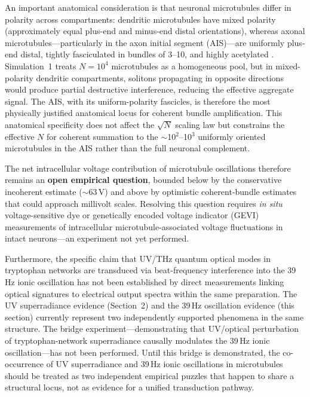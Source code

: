 \documentclass[10pt, a4paper, twocolumn]{article}
\begin{document}
An important anatomical consideration is that neuronal
microtubules differ in polarity across compartments: dendritic
microtubules have mixed polarity (approximately equal plus-end
and minus-end distal orientations), whereas axonal
microtubules---particularly in the axon initial segment
(AIS)---are uniformly plus-end distal, tightly fasciculated
in bundles of 3--10, and highly acetylated
\cite{beshkar2025}. Simulation~1 treats $N = 10^4$
microtubules as a homogeneous pool, but in mixed-polarity
dendritic compartments, solitons propagating in opposite
directions would produce partial destructive interference,
reducing the effective aggregate signal. The AIS, with its
uniform-polarity fascicles, is therefore the most physically
justified anatomical locus for coherent bundle amplification.
This anatomical specificity does not affect the $\sqrt{N}$
scaling law but constrains the effective $N$ for coherent
summation to the $\sim$10$^2$--10$^3$ uniformly oriented
microtubules in the AIS rather than the full neuronal
complement.

The net intracellular voltage contribution of microtubule
oscillations therefore remains an \textbf{open empirical
question}, bounded below by the conservative incoherent
estimate ($\sim\!63$\,\textmu V) and above by optimistic
coherent-bundle estimates that could approach millivolt
scales. Resolving this question requires \emph{in situ}
voltage-sensitive dye or genetically encoded voltage
indicator (GEVI) measurements of intracellular
microtubule-associated voltage fluctuations in intact
neurons---an experiment not yet performed.

Furthermore, the specific claim that UV/THz quantum optical modes in
tryptophan networks are transduced via beat-frequency interference into
the 39\,Hz ionic oscillation has not been established by direct
measurements linking optical signatures to electrical output spectra
within the same preparation. The UV superradiance evidence (Section~2)
and the 39\,Hz oscillation evidence (this section) currently represent
two independently supported phenomena in the same structure. The bridge
experiment---demonstrating that UV/optical perturbation of
tryptophan-network superradiance causally modulates the 39\,Hz ionic
oscillation---has not been performed. Until this bridge is demonstrated,
the co-occurrence of UV superradiance and 39\,Hz ionic oscillations in
microtubules should be treated as two independent empirical puzzles that
happen to share a structural locus, not as evidence for a unified
transduction pathway.
\end{document}
